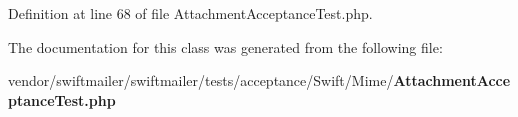 Definition at line 68 of file Attachment\+Acceptance\+Test.\+php.



The documentation for this class was generated from the following file\+:\begin{DoxyCompactItemize}
\item 
vendor/swiftmailer/swiftmailer/tests/acceptance/\+Swift/\+Mime/{\bf Attachment\+Acceptance\+Test.\+php}\end{DoxyCompactItemize}
